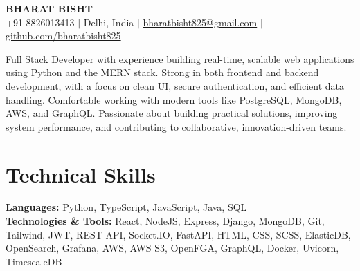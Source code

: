 \documentclass[10pt,letterpaper]{article}
\begin{document}
\begin{center}
  {\LARGE \textbf{BHARAT BISHT}}\\[3pt]
  +91 8826013413 \quad $\vert$ \quad Delhi, India \quad $\vert$ \quad
  \href{mailto:bharatbisht825@gmail.com}{bharatbisht825@gmail.com} \quad $\vert$ \quad
  \href{https://github.com/bharatbisht825}{github.com/bharatbisht825}
\end{center}

\small

Full Stack Developer with experience building real-time, scalable web applications
using Python and the MERN stack. Strong in both frontend and backend development,
with a focus on clean UI, secure authentication, and efficient data handling.
Comfortable working with modern tools like PostgreSQL, MongoDB, AWS, and GraphQL.
Passionate about building practical solutions, improving system performance, and
contributing to collaborative, innovation-driven teams.

\section{Technical Skills}
\textbf{Languages:} Python, TypeScript, JavaScript, Java, SQL\\
\textbf{Technologies \& Tools:} React, NodeJS, Express, Django, MongoDB, Git,
Tailwind, JWT, REST API, Socket.IO, FastAPI, HTML, CSS, SCSS, ElasticDB,
OpenSearch, Grafana, AWS, AWS S3, OpenFGA, GraphQL, Docker, Uvicorn, TimescaleDB
\end{document}
